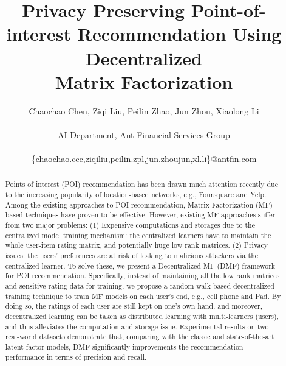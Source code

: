\documentclass[letterpaper]{article} %
\begin{document}
%
\title{Privacy Preserving Point-of-interest Recommendation Using Decentralized \\Matrix Factorization}
\author{Chaochao Chen, Ziqi Liu, Peilin Zhao, Jun Zhou, Xiaolong Li\\
~\\AI Department, Ant Financial Services Group\\
~\\\{chaochao.ccc,ziqiliu,peilin.zpl,jun.zhoujun,xl.li\}@antfin.com\\
}
\maketitle
\begin{abstract}
Points of interest (POI) recommendation has been drawn much attention recently due to the increasing popularity
of location-based networks, e.g., Foursquare and Yelp. 
Among the existing approaches to POI recommendation, Matrix Factorization (MF) based techniques have proven to be effective. 
However, existing MF approaches suffer from two major problems:
(1) Expensive computations and storages due to the centralized model training mechanism: the centralized
learners have to maintain the whole user-item rating matrix, and potentially huge low rank matrices.
(2) Privacy issues: the users' preferences are at risk of leaking to malicious attackers via
the centralized learner.
To solve these, we present a Decentralized MF (DMF) framework for POI recommendation. 
Specifically, instead of maintaining all the low rank matrices and sensitive rating data for training, we propose a
random walk based decentralized training technique to train MF models on each user's end, e.g., cell phone and Pad. 
By doing so, the ratings of each user are still kept on one's own hand, and moreover, decentralized learning can
be taken as distributed learning with multi-learners (users), and thus alleviates the computation and storage issue. 
Experimental results on two real-world datasets demonstrate that, comparing with the classic and state-of-the-art latent factor models, DMF significantly improvements the recommendation performance in terms of precision and recall.
\end{abstract}



 





\end{document}
